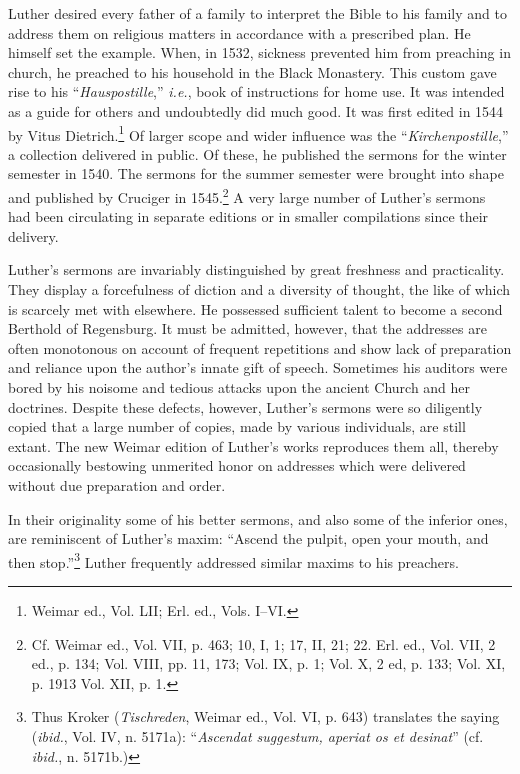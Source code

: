 Luther desired every father of a family to interpret the Bible to his
family and to address them on religious matters in accordance with
a prescribed plan. He himself set the example. When, in 1532, sickness
prevented him from preaching in church, he preached to his
household in the Black Monastery. This custom gave rise to his
“\textit{Hauspostille},” \textit{i.e.}, book of instructions for home
use. It was intended as a guide for others and undoubtedly did much good. It was
first edited in 1544 by Vitus Dietrich.\footnote{Weimar ed., Vol. LII; Erl. ed., Vols. I--VI.}
Of larger scope and wider influence
was the “\textit{Kirchenpostille},” a collection delivered in public.
Of these, he published the sermons for the winter semester in 1540.
The sermons for the summer semester were brought into shape and
published by Cruciger in 1545.\footnote
{Cf. Weimar ed., Vol. VII, p. 463; 10, I, 1; 17, II, 21; 22. Erl. ed., Vol. VII, 2 ed.,
p. 134; Vol. VIII, pp. 11, 173; Vol. IX, p. 1; Vol. X, 2 ed, p. 133; Vol. XI, p. 1913
Vol. XII, p. 1.}
A very large number of Luther’s
sermons had been circulating in separate editions or in smaller compilations
since their delivery.

Luther’s sermons are invariably distinguished by great freshness
and practicality. They display a forcefulness of diction and a diversity
of thought, the like of which is scarcely met with elsewhere. He
possessed sufficient talent to become a second Berthold of Regensburg.
It must be admitted, however, that the addresses are often monotonous
on account of frequent repetitions and show lack of preparation and reliance
upon the author’s innate gift of speech. Sometimes
his auditors were bored by his noisome and tedious attacks upon the
ancient Church and her doctrines. Despite these defects, however,
Luther’s sermons were so diligently copied that a large number of
copies, made by various individuals, are still extant. The new Weimar
edition of Luther’s works reproduces them all, thereby occasionally
bestowing unmerited honor on addresses which were delivered without
due preparation and order.

In their originality some of his better sermons, and also some of the
inferior ones, are reminiscent of Luther’s maxim: “Ascend the pulpit,
open your mouth, and then stop.”\footnote
{Thus Kroker (\textit{Tischreden}, Weimar ed., Vol. VI, p. 643) translates the saying (\textit{ibid.},
Vol. IV, n. 5171a): “\textit{Ascendat suggestum, aperiat os et desinat}” (cf. \textit{ibid.}, n. 5171b.)}
Luther frequently addressed similar
maxims to his preachers.

